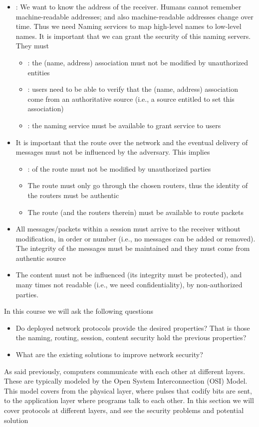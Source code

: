 \begin{itemize}
    \item {}: We want to know the address of the receiver. Humans cannot remember machine-readable addresses; and also machine-readable addresses change over time. Thus we need Naming services to map high-level names to low-level names. It is important that we can grant the security of this naming servers. They must
		\begin{itemize}
		    \item {}: the (name, address) association must not be modified by unauthorized entities
		    \item {}: users need to be able to verify that the (name, address) association come from an authoritative source (i.e., a source entitled to set this association)
		    \item {}: the naming service must be available to grant service to users
		\end{itemize}
    \item {} It is important that the route over the network and the eventual delivery of messages must not be influenced by the adversary. This implies
		\begin{itemize}
		    \item {}: of the route must not be modified by unauthorized parties
		    \item The route must only go through the chosen routers, thus the identity of the routers must be authentic
		    \item The route (and the routers therein) must be available to route packets
		\end{itemize}
    \item All messages/packets within a session must arrive to the receiver without modification, in order or number (i.e., no messages can be added or removed). The integrity of the messages must be maintained and they must come from authentic source
    \item The content must not be influenced (its integrity must be protected), and many times not readable (i.e., we need confidentiality), by non-authorized parties.
\end{itemize}
In this course we will ask the following questions
\begin{itemize}
    \item Do deployed network protocols provide the desired properties? That is those the naming, routing, session, content security hold the previous properties?
    \item What are the existing solutions to improve network security?
\end{itemize}
As said previously, computers communicate with each other at different layers. These are typically modeled by the Open System Interconnection (OSI) Model. This model covers from the physical layer, where pulses that codify bits are sent, to the application layer where programs talk to each other. In this section we will cover protocols at different layers, and see the security problems and potential solution

